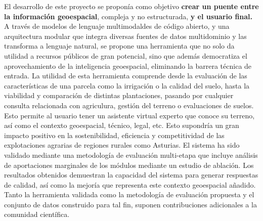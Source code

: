 El desarrollo de este proyecto se proponía como objetivo \textbf{crear un puente entre la información geoespacial}, compleja y no estructurada, \textbf{y el usuario final.} A través de modelos de lenguaje multimodaldes de código abierto, y una arquitectura modular que integra diversas fuentes de datos multidominio y las transforma a lenguaje natural, se propone una herramienta que no solo da utilidad a recursos públicos de gran potencial, sino que además democratiza el aprovechamiento de la inteligencia geoespacial, eliminando la barrera técnica de entrada. La utilidad de esta herramienta comprende desde la evaluación de las características de una parcela como la irrigación o la calidad del suelo, hasta la viabilidad y comparación de distintas plantaciones, pasando por cualquier consulta relacionada con agriculura, gestión del terreno o evaluaciones de suelos. Esto permite al usuario tener un asistente virtual experto que conoce su terreno, así como el contexto geoespacial, técnico, legal, etc. Esto supondría un gran impacto positivo en la sostenibilidad, eficiencia y competitividad de las explotaciones agrarias de regiones rurales como Asturias. El sistema ha sido validado mediante una metodología de evaluación multi-etapa que incluye análisis de aportaciones marginales de los módulos mediante un estudio de ablación. Los resultados obtenidos demuestran la capacidad del sistema para generar respuestas de calidad, así como la mejoría que representa este contexto geoespacial añadido. Tanto la herramienta validada como la metodología de evaluación propuesta y el conjunto de datos construido para tal fin, suponen contribuciones adicionales a la comunidad científica. 
